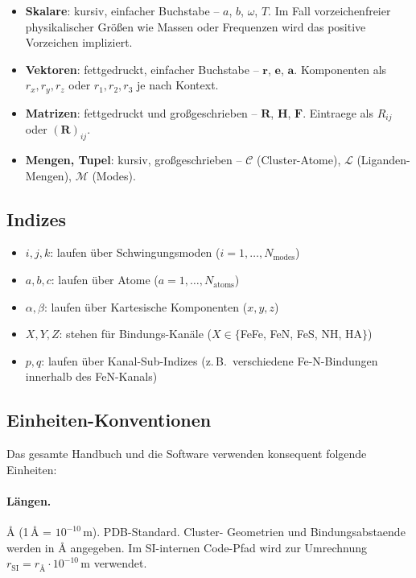 \documentclass[11pt,a4paper,twoside]{article}
\providecommand{\angstrom}{\text{\AA}}    %
\theoremstyle{remark}
\begin{document}
\begin{itemize}\setlength{\itemsep}{2pt}
  \item \textbf{Skalare}: kursiv, einfacher Buchstabe -- $a$, $b$,
        $\omega$, $T$. Im Fall vorzeichenfreier physikalischer
        Gr\"o{\ss}en wie Massen oder Frequenzen wird das positive
        Vorzeichen impliziert.
  \item \textbf{Vektoren}: fettgedruckt, einfacher Buchstabe --
        $\mathbf{r}$, $\mathbf{e}$, $\mathbf{a}$. Komponenten als
        $r_x, r_y, r_z$ oder $r_1, r_2, r_3$ je nach Kontext.
  \item \textbf{Matrizen}: fettgedruckt und gro{\ss}geschrieben --
        $\mathbf{R}$, $\mathbf{H}$, $\mathbf{F}$. Eintraege als
        $R_{ij}$ oder $(\mathbf{R})_{ij}$.
  \item \textbf{Mengen, Tupel}: kursiv, gro{\ss}geschrieben --
        $\mathcal{C}$ (Cluster-Atome), $\mathcal{L}$
        (Liganden-Mengen), $\mathcal{M}$ (Modes).
\end{itemize}

\subsection{Indizes}

\begin{itemize}\setlength{\itemsep}{2pt}
  \item $i, j, k$: laufen \"uber Schwingungsmoden ($i = 1, \ldots,
        N_\text{modes}$)
  \item $a, b, c$: laufen \"uber Atome ($a = 1, \ldots, N_\text{atoms}$)
  \item $\alpha, \beta$: laufen \"uber Kartesische Komponenten
        ($x, y, z$)
  \item $X, Y, Z$: stehen f\"ur Bindungs-Kan\"ale
        ($X \in \{$FeFe, FeN, FeS, NH, HA$\}$)
  \item $p, q$: laufen \"uber Kanal-Sub-Indizes (z.\,B.\ verschiedene
        Fe-N-Bindungen innerhalb des FeN-Kanals)
\end{itemize}

\subsection{Einheiten-Konventionen}

Das gesamte Handbuch und die Software verwenden konsequent
folgende Einheiten:

\paragraph{L\"angen.}
$\angstrom$ (1\,$\angstrom$ = $10^{-10}$\,m). PDB-Standard. Cluster-
Geometrien und Bindungsabstaende werden in $\angstrom$ angegeben.
Im SI-internen Code-Pfad wird zur Umrechnung
$r_\text{SI} = r_{\angstrom} \cdot 10^{-10}$\,m verwendet.
\end{document}
